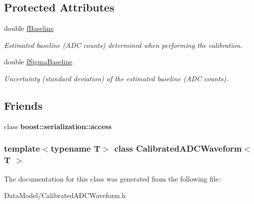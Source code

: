 \subsection*{Protected Attributes}
\begin{DoxyCompactItemize}
\item 
\hypertarget{classCalibratedADCWaveform_a149f3756091ef8101f03db1740db9caf}{
double \hyperlink{classCalibratedADCWaveform_a149f3756091ef8101f03db1740db9caf}{fBaseline}}
\label{classCalibratedADCWaveform_a149f3756091ef8101f03db1740db9caf}

\begin{DoxyCompactList}\small\item\em Estimated baseline (ADC counts) determined when performing the calibration. \item\end{DoxyCompactList}\item 
\hypertarget{classCalibratedADCWaveform_afad42e8ea016aa63d12da79d99b9a40c}{
double \hyperlink{classCalibratedADCWaveform_afad42e8ea016aa63d12da79d99b9a40c}{fSigmaBaseline}}
\label{classCalibratedADCWaveform_afad42e8ea016aa63d12da79d99b9a40c}

\begin{DoxyCompactList}\small\item\em Uncertainty (standard deviation) of the estimated baseline (ADC counts). \item\end{DoxyCompactList}\end{DoxyCompactItemize}
\subsection*{Friends}
\begin{DoxyCompactItemize}
\item 
\hypertarget{classCalibratedADCWaveform_ac98d07dd8f7b70e16ccb9a01abf56b9c}{
class {\bfseries boost::serialization::access}}
\label{classCalibratedADCWaveform_ac98d07dd8f7b70e16ccb9a01abf56b9c}

\end{DoxyCompactItemize}
\subsubsection*{template$<$typename T$>$ class CalibratedADCWaveform$<$ T $>$}



The documentation for this class was generated from the following file:\begin{DoxyCompactItemize}
\item 
DataModel/CalibratedADCWaveform.h\end{DoxyCompactItemize}
